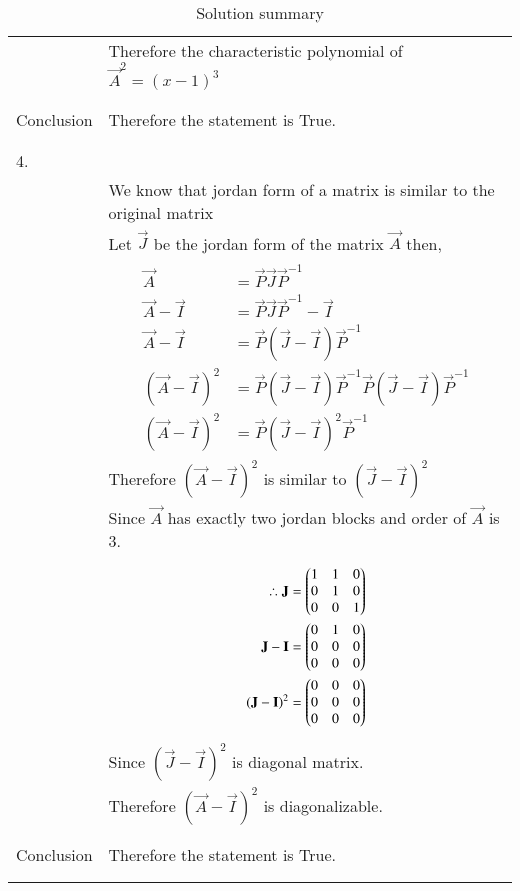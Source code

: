\documentclass[journal,12pt]{IEEEtran}
\begin{document}
\begin{longtable}{|l|l|}
&Therefore the characteristic polynomial of $\vec{A}^2 = (x-1)^3$\\
&\\
\hline
&\\
Conclusion&Therefore the statement is True.\\
&\\
\hline
\pagebreak
\hline
&\\
4.&\\
&We know that jordan form of a matrix is similar to the original matrix\\
&Let $\vec{J}$ be the jordan form of the matrix $\vec{A}$ then,\\
&\parbox{6cm}{\begin{align*}
    \vec{A}&=\vec{P}\vec{J}\vec{P}^{-1}\\
    \vec{A}-\vec{I}&=\vec{P}\vec{J}\vec{P}^{-1}-\vec{I}\\
    \vec{A}-\vec{I}&=\vec{P}(\vec{J}-\vec{I})\vec{P}^{-1}\\
    (\vec{A}-\vec{I})^2&=\vec{P}(\vec{J}-\vec{I})\vec{P}^{-1}\vec{P}(\vec{J}-\vec{I})\vec{P}^{-1}\\
    (\vec{A}-\vec{I})^2&=\vec{P}(\vec{J}-\vec{I})^2\vec{P}^{-1}
\end{align*}}\\
&Therefore $(\vec{A}-\vec{I})^2$ is similar to $(\vec{J}-\vec{I})^2$\\
&Since $\vec{A}$ has exactly two jordan blocks and order of $\vec{A}$ is 3.\\
&\parbox{6cm}{\begin{align*}
    \therefore \mathbf{J}&=\begin{pmatrix}1&1&0\\0&1&0\\0&0&1\end{pmatrix}\\
    \mathbf{J}-\mathbf{I}&=\begin{pmatrix}0&1&0\\0&0&0\\0&0&0\end{pmatrix}\\
    (\mathbf{J}-\mathbf{I})^2&=\begin{pmatrix}0&0&0\\0&0&0\\0&0&0\end{pmatrix}
\end{align*}}\\
&Since $(\vec{J}-\vec{I})^2$ is diagonal matrix.\\
&Therefore $(\vec{A}-\vec{I})^2$ is diagonalizable.\\
&\\
\hline
&\\
Conclusion&Therefore the statement is True.\\
&\\
\hline
\caption{Solution summary}
\label{table:2}
\end{longtable}
\end{document}
